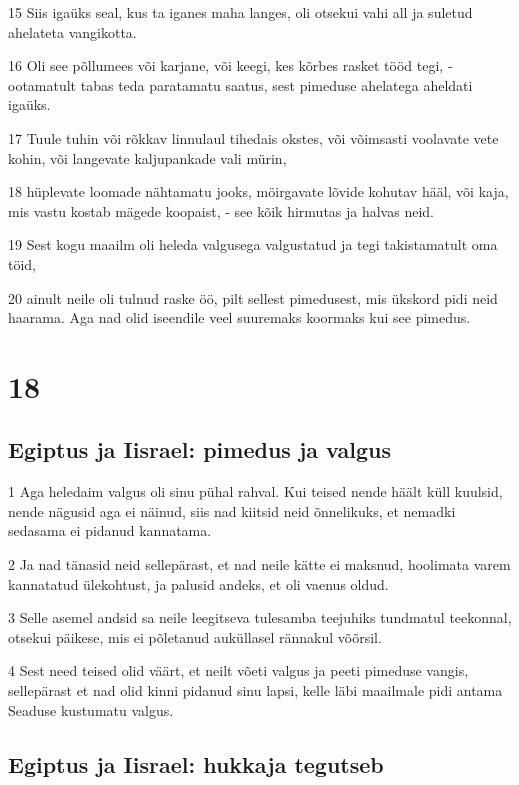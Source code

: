 \par 15 Siis igaüks seal, kus ta iganes maha langes, oli otsekui vahi all ja suletud ahelateta vangikotta.
\par 16 Oli see põllumees või karjane, või keegi, kes kõrbes rasket tööd tegi, - ootamatult tabas teda paratamatu saatus, sest pimeduse ahelatega aheldati igaüks.
\par 17 Tuule tuhin või rõkkav linnulaul tihedais okstes, või võimsasti voolavate vete kohin, või langevate kaljupankade vali mürin,
\par 18 hüplevate loomade nähtamatu jooks, möirgavate lõvide kohutav hääl, või kaja, mis vastu kostab mägede koopaist, - see kõik hirmutas ja halvas neid.
\par 19 Sest kogu maailm oli heleda valgusega valgustatud ja tegi takistamatult oma töid,
\par 20 ainult neile oli tulnud raske öö, pilt sellest pimedusest, mis ükskord pidi neid haarama. Aga nad olid iseendile veel suuremaks koormaks kui see pimedus. 

\chapter{18} 

\section*{Egiptus ja Iisrael: pimedus ja valgus}

\par 1 Aga heledaim valgus oli sinu pühal rahval. Kui teised nende häält küll kuulsid, nende nägusid aga ei näinud, siis nad kiitsid neid õnnelikuks, et nemadki sedasama ei pidanud kannatama.
\par 2 Ja nad tänasid neid sellepärast, et nad neile kätte ei maksnud, hoolimata varem kannatatud ülekohtust, ja palusid andeks, et oli vaenus oldud.
\par 3 Selle asemel andsid sa neile leegitseva tulesamba teejuhiks tundmatul teekonnal, otsekui päikese, mis ei põletanud auküllasel rännakul võõrsil.
\par 4 Sest need teised olid väärt, et neilt võeti valgus ja peeti pimeduse vangis, sellepärast et nad olid kinni pidanud sinu lapsi, kelle läbi maailmale pidi antama Seaduse kustumatu valgus. 

\section*{Egiptus ja Iisrael: hukkaja tegutseb}

